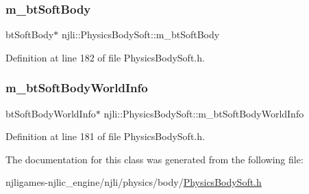 \subsubsection{\texorpdfstring{m\+\_\+bt\+Soft\+Body}{m\_btSoftBody}}
{\footnotesize\ttfamily bt\+Soft\+Body$\ast$ njli\+::\+Physics\+Body\+Soft\+::m\+\_\+bt\+Soft\+Body\hspace{0.3cm}{\ttfamily [private]}}



Definition at line 182 of file Physics\+Body\+Soft.\+h.

\mbox{\label{classnjli_1_1_physics_body_soft_a3a3770a0489d8629de7b88de0c79fad3}} 
\subsubsection{\texorpdfstring{m\+\_\+bt\+Soft\+Body\+World\+Info}{m\_btSoftBodyWorldInfo}}
{\footnotesize\ttfamily bt\+Soft\+Body\+World\+Info$\ast$ njli\+::\+Physics\+Body\+Soft\+::m\+\_\+bt\+Soft\+Body\+World\+Info\hspace{0.3cm}{\ttfamily [private]}}



Definition at line 181 of file Physics\+Body\+Soft.\+h.



The documentation for this class was generated from the following file\+:\begin{DoxyCompactItemize}
\item 
njligames-\/njlic\+\_\+engine/njli/physics/body/\mbox{\hyperlink{_physics_body_soft_8h}{Physics\+Body\+Soft.\+h}}\end{DoxyCompactItemize}
